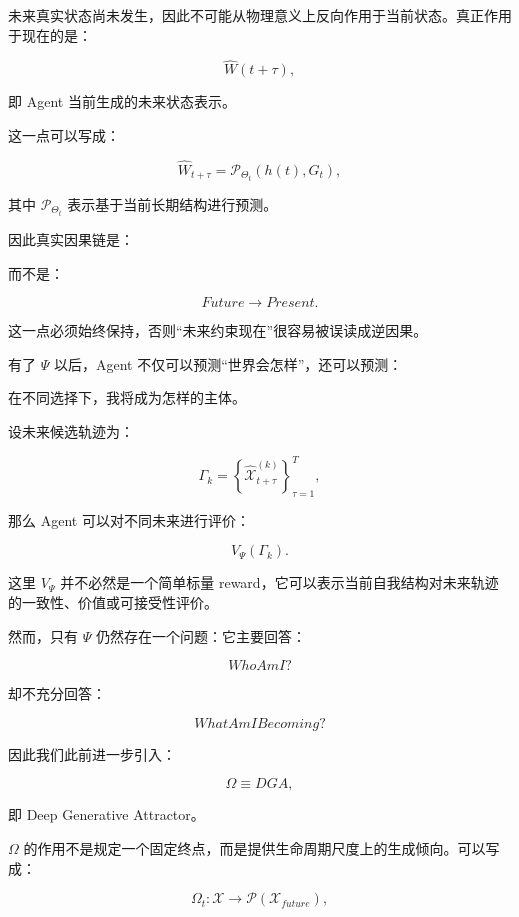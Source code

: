 未来真实状态尚未发生，因此不可能从物理意义上反向作用于当前状态。真正作用于现在的是：

\[
\hat{W}(t+\tau),
\]

即 Agent 当前生成的未来状态表示。

这一点可以写成：

\[
\hat{W}_{t+\tau}
=
\mathcal{P}_{\Theta_t}
\left(
h(t),G_t
\right),
\]

其中 $\mathcal{P}_{\Theta_t}$ 表示基于当前长期结构进行预测。

因此真实因果链是：

\begin{statementbox}
\centering
{}
\end{statementbox}

而不是：

\[
Future
\rightarrow
Present.
\]

这一点必须始终保持，否则“未来约束现在”很容易被误读成逆因果。

有了 $\Psi$ 以后，Agent 不仅可以预测“世界会怎样”，还可以预测：

\begin{statementbox}
在不同选择下，我将成为怎样的主体。
\end{statementbox}

设未来候选轨迹为：

\[
\Gamma_k
=
\left\{
\hat{\mathcal{X}}_{t+\tau}^{(k)}
\right\}_{\tau=1}^{T},
\]

那么 Agent 可以对不同未来进行评价：

\[
V_{\Psi}
(\Gamma_k).
\]

这里 $V_{\Psi}$ 并不必然是一个简单标量 reward，它可以表示当前自我结构对未来轨迹的一致性、价值或可接受性评价。

然而，只有 $\Psi$ 仍然存在一个问题：它主要回答：

\[
WhoAmI?
\]

却不充分回答：

\[
WhatAmIBecoming?
\]

因此我们此前进一步引入：

\[
\Omega
\equiv
DGA,
\]

即 Deep Generative Attractor。

$\Omega$ 的作用不是规定一个固定终点，而是提供生命周期尺度上的生成倾向。可以写成：

\[
\Omega_t
:
\mathcal{X}
\rightarrow
\mathcal{P}
\left(
\mathcal{X}_{future}
\right),
\]

